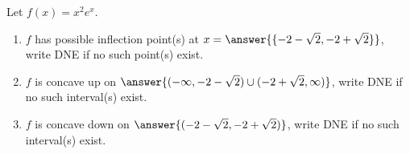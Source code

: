 \documentclass{ximera}
\author{Gregory Hartman \and Matthew Carr}
\begin{document}
\begin{exercise}






Let $f(x)=x^{2}e^x$.
\begin{enumerate}
\item		$f$ has possible inflection point(s) at $x=\answer{\{-2-\sqrt{2},-2+\sqrt{2}\}}$, write DNE if no such point(s) exist.
\item		$f$ is concave up on $\answer{(-\infty,-2-\sqrt{2})\cup(-2+\sqrt{2},\infty)}$, write DNE if no such interval(s) exist.
\item		$f$ is concave down on $\answer{(-2-\sqrt{2},-2+\sqrt{2})}$, write DNE if no such interval(s) exist.
\end{enumerate}

\end{exercise}
\end{document}
